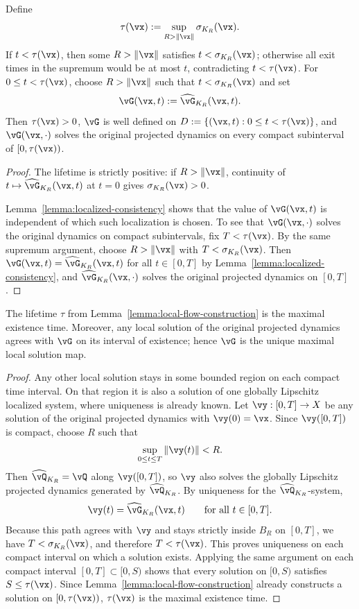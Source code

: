 \begin{lemma}\label{lemma:local-flow-construction}
Define
\[
\tau(\vx):=\sup_{R>\|\vx\|}\sigma_{K_R}(\vx).
\]
If $t<\tau(\vx)$, then some $R>\|\vx\|$ satisfies
$t<\sigma_{K_R}(\vx)$; otherwise all exit times in the supremum would be at
most $t$, contradicting $t<\tau(\vx)$.
For $0\le t<\tau(\vx)$, choose $R>\|\vx\|$ such that
$t<\sigma_{K_R}(\vx)$ and set
\[
\vG(\vx,t):=\widehat{\vG}_{K_R}(\vx,t).
\]
Then $\tau(\vx)>0$, $\vG$ is well defined on
$D:=\{(\vx,t):0\le t<\tau(\vx)\}$, and $\vG(\vx,\cdot)$ solves the original
projected dynamics on every compact subinterval of $[0,\tau(\vx))$.
\end{lemma}
\begin{proof}
The lifetime is strictly positive: if $R>\|\vx\|$, continuity of
$t\mapsto \widehat{\vG}_{K_R}(\vx,t)$ at $t=0$ gives
$\sigma_{K_R}(\vx)>0$.

Lemma~\ref{lemma:localized-consistency} shows that the value of
$\vG(\vx,t)$ is independent of which such localization is chosen. To see that
$\vG(\vx,\cdot)$ solves the original dynamics on compact subintervals, fix
$T<\tau(\vx)$. By the same supremum argument, choose $R>\|\vx\|$ with
$T<\sigma_{K_R}(\vx)$. Then
$\vG(\vx,t)=\widehat{\vG}_{K_R}(\vx,t)$ for all $t\in[0,T]$ by
Lemma~\ref{lemma:localized-consistency}, and
$\widehat{\vG}_{K_R}(\vx,\cdot)$ solves the original projected dynamics on
$[0,T]$.
\end{proof}

\begin{lemma}\label{lemma:maximal-local-flow}
The lifetime $\tau$ from Lemma~\ref{lemma:local-flow-construction} is the
maximal existence time. Moreover, any local solution of the original projected
dynamics agrees with $\vG$ on its interval of existence; hence $\vG$ is the
unique maximal local solution map.
\end{lemma}
\begin{proof}
Any other local solution stays in some bounded region on each compact time
interval. On that region it is also a solution of one globally Lipschitz
localized system, where uniqueness is already known.
Let $\vy:[0,T]\to X$ be any solution of the original
projected dynamics with $\vy(0)=\vx$. Since $\vy([0,T])$ is compact, choose
$R$ such that
\[
\sup_{0\le t\le T}\|\vy(t)\|<R.
\]
Then $\widehat{\vQ}_{K_R}=\vQ$ along $\vy([0,T])$, so $\vy$ also solves the
globally Lipschitz projected dynamics generated by $\widehat{\vQ}_{K_R}$. By
uniqueness for the $\widehat{\vQ}_{K_R}$-system,
\[
\vy(t)=\widehat{\vG}_{K_R}(\vx,t)\qquad\text{for all }t\in[0,T].
\]
Because this path agrees with $\vy$ and stays strictly inside $B_R$ on $[0,T]$,
we have $T<\sigma_{K_R}(\vx)$, and therefore $T<\tau(\vx)$. This proves
uniqueness on each compact interval on which a solution exists. Applying the
same argument on each compact interval $[0,T]\subset[0,S)$ shows that every
solution on $[0,S)$ satisfies $S\le \tau(\vx)$. Since
Lemma~\ref{lemma:local-flow-construction} already constructs a solution on
$[0,\tau(\vx))$, $\tau(\vx)$ is the maximal existence time.
\end{proof}

